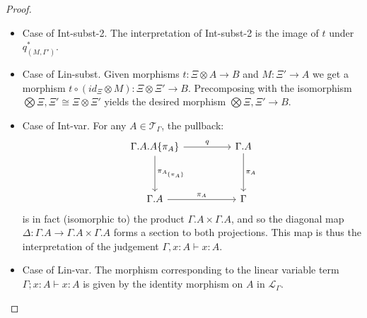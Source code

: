 \begin{thm}[Soundness]
\begin{proof}
\begin{itemize}
\item Case of Int-subst-2. The interpretation of Int-subst-2 is the image of $t$ under $q_{(M, \Gamma')}^*$.
\item Case of Lin-subst. Given morphisms $t : \Xi \otimes A \to B$ and $M : \Xi' \to A$ we get a morphism $t \circ (id_\Xi \otimes M) : \Xi \otimes \Xi' \to B$. Precomposing with the isomorphism $\bigotimes \Xi, \Xi' \cong \Xi \otimes \Xi'$ yields the desired morphism $\bigotimes \Xi, \Xi' \to B$.
\item Case of Int-var. For any $A \in \mathcal{T}_\Gamma$, the pullback:
  \[
    \ti
    \Gamma.A.A\{\pi_A\} \ar[r, "q"] \ar[d, "\pi_{A_{\{\pi_A\}}}"] & \Gamma.A \ar[d, "\pi_A"]\\
    \Gamma.A \ar[r, "\pi_A"] & \Gamma
    \kz
  \]
  is in fact (isomorphic to) the product $\Gamma.A \times \Gamma.A$, and so the diagonal map $\Delta : \Gamma.A \to \Gamma.A \times \Gamma.A$ forms a section to both projections.
  This map is thus the interpretation of the judgement $\Gamma, x : A \vdash x : A$.
\item Case of Lin-var. The morphism corresponding to the linear variable term $\Gamma; x : A \vdash x : A$ is given by the identity morphism on $A$ in $\mathcal{L}_{\Gamma}$.
\end{itemize}
\end{proof}
\end{thm}
